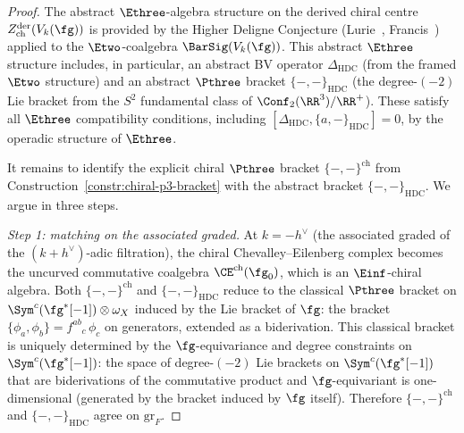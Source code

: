 \begin{proof}
The abstract $\Ethree$-algebra structure on the derived
chiral centre $Z^{\mathrm{der}}_{\mathrm{ch}}(V_k(\fg))$
is provided by the Higher Deligne Conjecture
\textup{(}Lurie~\cite{HA}, Francis~\cite{Francis2013}\textup{)}
applied to the $\Etwo$-coalgebra $\BarSig(V_k(\fg))$.
This abstract $\Ethree$ structure includes, in particular,
an abstract BV operator $\Delta_{\mathrm{HDC}}$
(from the framed $\Etwo$ structure) and an abstract
$\Pthree$ bracket $\{-,-\}_{\mathrm{HDC}}$
(the degree-$(-2)$ Lie bracket from the $S^2$ fundamental
class of $\Conf_2(\RR^3)/\RR^+$). These satisfy all
$\Ethree$ compatibility conditions, including
$[\Delta_{\mathrm{HDC}}, \{a, -\}_{\mathrm{HDC}}] = 0$,
by the operadic structure of $\Ethree$.

It remains to identify the explicit chiral $\Pthree$
bracket $\{-,-\}^{\mathrm{ch}}$ from
Construction~\ref{constr:chiral-p3-bracket} with
the abstract bracket $\{-,-\}_{\mathrm{HDC}}$. We argue
in three steps.

\textit{Step 1: matching on the associated graded.}
At $k = -h^\vee$ (the associated graded of the
$(k+h^\vee)$-adic filtration), the chiral
Chevalley--Eilenberg complex becomes the uncurved
commutative coalgebra $\CE^{\mathrm{ch}}(\fg_0)$,
which is an $\Einf$-chiral algebra.
Both $\{-,-\}^{\mathrm{ch}}$ and $\{-,-\}_{\mathrm{HDC}}$
reduce to the classical $\Pthree$ bracket on
$\Sym^c(\fg^*[-1]) \otimes \omega_X$ induced by the Lie
bracket of $\fg$: the bracket
$\{\phi_a, \phi_b\} = f^{ab}{}_c\,\phi_c$ on generators,
extended as a biderivation.
This classical bracket is uniquely determined by the
$\fg$-equivariance and degree constraints on
$\Sym^c(\fg^*[-1])$: the space of degree-$(-2)$
Lie brackets on $\Sym^c(\fg^*[-1])$ that are
biderivations of the commutative product and
$\fg$-equivariant is one-dimensional (generated by the
bracket induced by $\fg$ itself). Therefore
$\{-,-\}^{\mathrm{ch}}$ and $\{-,-\}_{\mathrm{HDC}}$
agree on $\mathrm{gr}_F$.


\end{proof}
